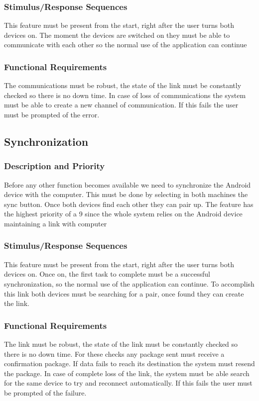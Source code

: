 \documentclass{article}
\begin{document}
\subsubsection{Stimulus/Response Sequences}
This feature must be present from the start, right after the user turns both devices on.  
The moment the devices are switched on they must be able to communicate with each other so the normal use of the application can continue
\subsubsection{Functional Requirements}
The communications must be robust, the state of the link must be constantly checked so there is no down time. 
In case of loss of communications the system must be able to create a new channel of communication. 
If this fails the user must be prompted of the error.

\subsection{Synchronization}
\subsubsection{Description and Priority}
Before any other function becomes available we need to synchronize the Android device with the computer. 
This must be done by selecting in both machines the sync button. 
Once both devices find each other they can pair up. 
The feature has the highest priority of a 9 since the whole system relies on the Android device maintaining a link with computer
\subsubsection{Stimulus/Response Sequences}
This feature must be present from the start, right after the user turns both devices on. 
Once on, the first task to complete must be a successful synchronization, so the normal use of the application can continue. 
To accomplish this link both devices must be searching for a pair, once found they can create the link.
\subsubsection{Functional Requirements}
The link must be robust, the state of the link must be constantly checked so there is no down time. 
For these checks any package sent must receive a confirmation package. 
 If data fails to reach its destination the system must resend the package. 
In case of complete loss of the link, the system must be able search for the same device to try and reconnect automatically. 
If this fails the user must be prompted of the failure.
\end{document}
